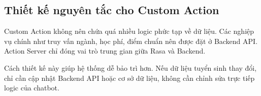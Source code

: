 \subsection*{Thiết kế nguyên tắc cho Custom Action}

Custom Action không nên chứa quá nhiều logic phức tạp về dữ liệu. Các nghiệp vụ chính như truy vấn ngành, học phí, điểm chuẩn nên được đặt ở Backend API. Action Server chỉ đóng vai trò trung gian giữa Rasa và Backend.

Cách thiết kế này giúp hệ thống dễ bảo trì hơn. Nếu dữ liệu tuyển sinh thay đổi, chỉ cần cập nhật Backend API hoặc cơ sở dữ liệu, không cần chỉnh sửa trực tiếp logic của chatbot.

